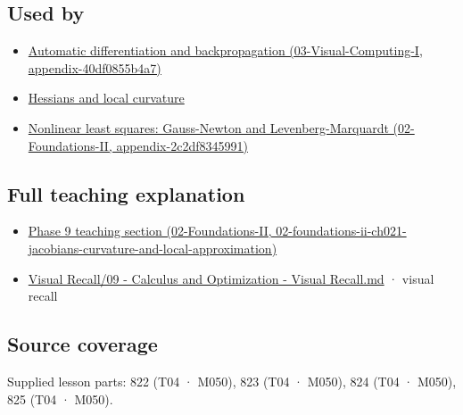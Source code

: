\subsection{Used by}\label{appendix-d8a7ddb675eb-used-by}

\begin{itemize}
\tightlist
\item
  \href{../03-Visual-Computing-I/main.pdf\#nameddest=appendix-40df0855b4a7}{Automatic differentiation and backpropagation (03-Visual-Computing-I, appendix-40df0855b4a7)}
\item
  \hyperref[appendix-6ac071f8b50c]{Hessians and local curvature}
\item
  \href{../02-Foundations-II/main.pdf\#nameddest=appendix-2c2df8345991}{Nonlinear least squares: Gauss-Newton and Levenberg-Marquardt (02-Foundations-II, appendix-2c2df8345991)}
\end{itemize}

\subsection{Full teaching explanation}\label{appendix-d8a7ddb675eb-full-teaching-explanation}

\begin{itemize}
\tightlist
\item
  \href{../02-Foundations-II/main.pdf\#nameddest=02-foundations-ii-ch021-jacobians-curvature-and-local-approximation}{Phase 9 teaching section (02-Foundations-II, 02-foundations-ii-ch021-jacobians-curvature-and-local-approximation)}
\item
  \hyperref[appendix-adf48f5dc5c1]{Visual Recall/09 - Calculus and Optimization - Visual Recall.md} · visual recall
\end{itemize}

\subsection{Source coverage}\label{appendix-d8a7ddb675eb-source-coverage}

Supplied lesson parts: 822 (T04 · M050), 823 (T04 · M050), 824 (T04 · M050), 825 (T04 · M050).
